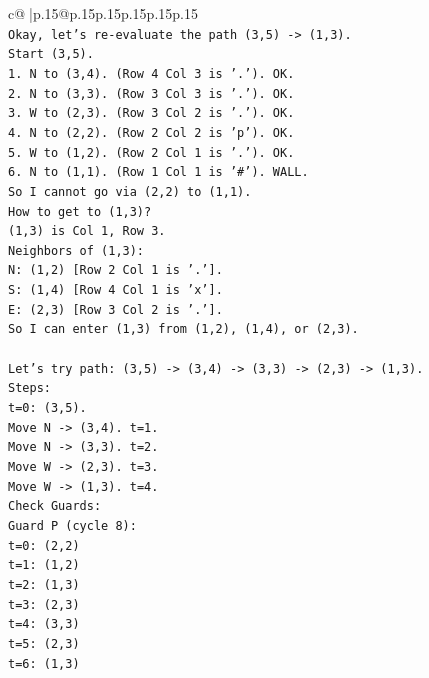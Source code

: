 \documentclass{article}
\begin{document}
{\begin{supertabular}{c@{$\;$}|p{.15\linewidth}@{}p{.15\linewidth}p{.15\linewidth}p{.15\linewidth}p{.15\linewidth}p{.15\linewidth}}
{{{\\ 
\texttt{Okay, let's re{-}evaluate the path (3,5) {-}> (1,3).} \\
\texttt{Start (3,5).} \\
\texttt{1. N to (3,4). (Row 4 Col 3 is '.'). OK.} \\
\texttt{2. N to (3,3). (Row 3 Col 3 is '.'). OK.} \\
\texttt{3. W to (2,3). (Row 3 Col 2 is '.'). OK.} \\
\texttt{4. N to (2,2). (Row 2 Col 2 is 'p'). OK.} \\
\texttt{5. W to (1,2). (Row 2 Col 1 is '.'). OK.} \\
\texttt{6. N to (1,1). (Row 1 Col 1 is '\#'). WALL.} \\
\texttt{So I cannot go via (2,2) to (1,1).} \\
\texttt{How to get to (1,3)?} \\
\texttt{(1,3) is Col 1, Row 3.} \\
\texttt{Neighbors of (1,3):} \\
\texttt{N: (1,2) {[}Row 2 Col 1 is '.'{]}.} \\
\texttt{S: (1,4) {[}Row 4 Col 1 is 'x'{]}.} \\
\texttt{E: (2,3) {[}Row 3 Col 2 is '.'{]}.} \\
\texttt{So I can enter (1,3) from (1,2), (1,4), or (2,3).} \\
\\ 
\texttt{Let's try path: (3,5) {-}> (3,4) {-}> (3,3) {-}> (2,3) {-}> (1,3).} \\
\texttt{Steps:} \\
\texttt{t=0: (3,5).} \\
\texttt{Move N {-}> (3,4). t=1.} \\
\texttt{Move N {-}> (3,3). t=2.} \\
\texttt{Move W {-}> (2,3). t=3.} \\
\texttt{Move W {-}> (1,3). t=4.} \\
\texttt{Check Guards:} \\
\texttt{Guard P (cycle 8):} \\
\texttt{t=0: (2,2)} \\
\texttt{t=1: (1,2)} \\
\texttt{t=2: (1,3)} \\
\texttt{t=3: (2,3)} \\
\texttt{t=4: (3,3)} \\
\texttt{t=5: (2,3)} \\
\texttt{t=6: (1,3)} \\
}}}
\end{supertabular}}
\end{document}
